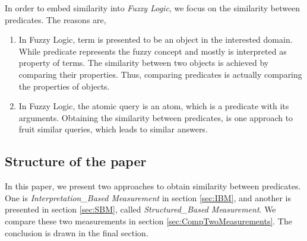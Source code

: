 In order to embed similarity into \textit{Fuzzy Logic}, we focus on the similarity between predicates. The reasons are,

\begin{enumerate}
\item In Fuzzy Logic, term is presented to be an object in the interested domain. While predicate represents the fuzzy concept and mostly is interpreted as property of terms. The similarity between two objects is achieved by comparing their properties. Thus, comparing predicates is actually comparing the properties of objects.

\item In Fuzzy Logic, the atomic query is an atom, which is a predicate with its arguments. Obtaining the similarity between predicates,  is one approach to fruit similar queries, which leads to similar answers.
\end{enumerate}

\subsection{Structure of the paper}
In this paper,  we present two approaches to obtain similarity between predicates. One is \textit{Interpretation\_Based Measurement} in section \ref{sec:IBM}, and another is presented in section \ref{sec:SBM}, called \textit{Structured\_Based Measurement}. We compare these two measurements in section \ref{sec:CompTwoMeasurements}. The conclusion is drawn in the final section.
